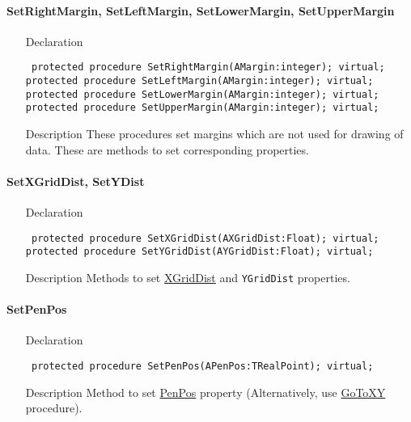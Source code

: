 \documentclass[12pt,a4paper,oneside]{report}
\newcommand{\declarationitem}[1]{{\addfontfeatures{FakeSlant} #1}}
\newcommand{\descriptiontitle}[1]{{\addfontfeatures{FakeSlant}#1}}
\newcommand{\code}[1]{\texttt{#1}}
\begin{document}
\paragraph{SetRightMargin, SetLeftMargin, SetLowerMargin, SetUpperMargin}\hspace*{\fill}
\label{lmcoordsys.TCoordSys-SetRightMargin}
\label{lmcoordsys.TCoordSys-SetLowerMargin}
\label{lmcoordsys.TCoordSys-SetUpperMargin}
\label{lmcoordsys.TCoordSys-SetLeftMargin}
\begin{itemize}\item[\declarationitem{Declaration}\hfill]
	\begin{flushleft}
		\code{
			protected procedure SetRightMargin(AMargin:integer); virtual;\\
			protected procedure SetLeftMargin(AMargin:integer); virtual;\\
			protected procedure SetLowerMargin(AMargin:integer); virtual;\\
			protected procedure SetUpperMargin(AMargin:integer); virtual;}
	\end{flushleft}
	\item[\descriptiontitle{Description}] These procedures set margins which are not used for drawing of data. These are methods to set corresponding properties.
\end{itemize}

\paragraph{SetXGridDist, SetYDist}\hspace*{\fill}
\label{lmcoordsys.TCoordSys-SetXGridDist}
\begin{itemize}\item[\declarationitem{Declaration}\hfill]
	\begin{flushleft}
		\code{
			protected procedure SetXGridDist(AXGridDist:Float); virtual;\\
			protected procedure SetYGridDist(AYGridDist:Float); virtual;}
	\end{flushleft}
	\item[\descriptiontitle{Description}] Methods to set \hyperref[lmcoordsys.TCoordSys-XGridDist]{XGridDist} and \code{YGridDist} properties.
\end{itemize}
\paragraph{SetPenPos}\hspace*{\fill}
\label{lmcoordsys.TCoordSys-SetPenPos}
\begin{itemize}\item[\declarationitem{Declaration}\hfill]
	\begin{flushleft}
		\code{
			protected procedure SetPenPos(APenPos:TRealPoint); virtual;}
	\end{flushleft}
	\item[\descriptiontitle{Description}] Method to set \hyperref[lmcoordsys.TCoordSys-PenPos]{PenPos} property (Alternatively, use \hyperref[lmcoordsys.TCoordSys-GoToXY]{GoToXY} procedure).
\end{itemize}
\end{document}
